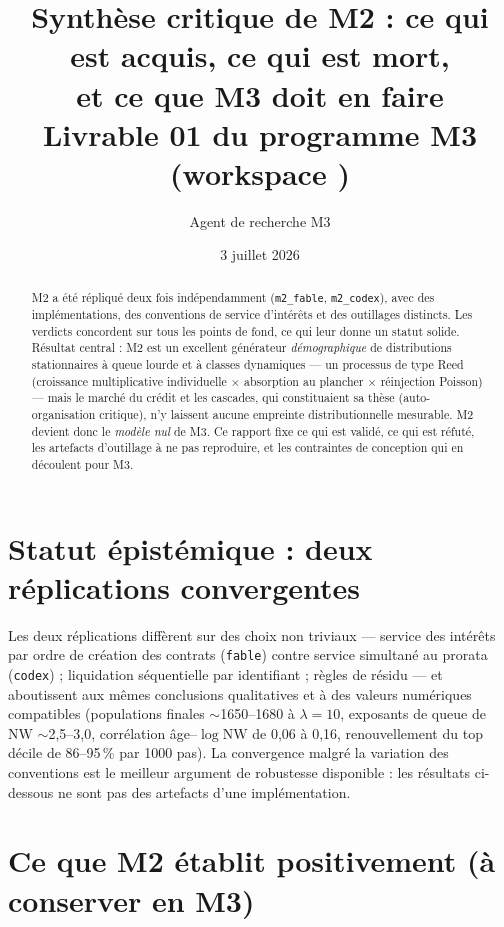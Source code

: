 \documentclass[11pt,a4paper]{article}
\title{Synthèse critique de M2 : ce qui est acquis, ce qui est mort,\\
et ce que M3 doit en faire\\
\large Livrable 01 du programme M3 (workspace \code{m3\_credit\_soc})}
\author{Agent de recherche M3}
\date{3 juillet 2026}
\newcommand{\NW}{\mathrm{NW}}
\newcommand{\code}[1]{\texttt{#1}}
\begin{document}
\maketitle

\begin{abstract}
M2 a été répliqué deux fois indépendamment (\code{m2\_fable}, \code{m2\_codex}),
avec des implémentations, des conventions de service d'intérêts et des outillages
distincts. Les verdicts concordent sur tous les points de fond, ce qui leur donne
un statut solide. Résultat central : M2 est un excellent générateur
\emph{démographique} de distributions stationnaires à queue lourde et à classes
dynamiques --- un processus de type Reed (croissance multiplicative individuelle
$\times$ absorption au plancher $\times$ réinjection Poisson) --- mais le marché
du crédit et les cascades, qui constituaient sa thèse (auto-organisation
critique), n'y laissent aucune empreinte distributionnelle mesurable. M2 devient
donc le \emph{modèle nul} de M3. Ce rapport fixe ce qui est validé, ce qui est
réfuté, les artefacts d'outillage à ne pas reproduire, et les contraintes de
conception qui en découlent pour M3.
\end{abstract}

\section{Statut épistémique : deux réplications convergentes}

Les deux réplications diffèrent sur des choix non triviaux --- service des
intérêts par ordre de création des contrats (\code{fable}) contre service
simultané au prorata (\code{codex}) ; liquidation séquentielle par identifiant ;
règles de résidu --- et aboutissent aux mêmes conclusions qualitatives et à des
valeurs numériques compatibles (populations finales $\sim$1650--1680 à
$\lambda=10$, exposants de queue de $\NW$ $\sim$2,5--3,0, corrélation
âge--$\log\NW$ de 0,06 à 0,16, renouvellement du top décile de 86--95\,\% par
1000 pas). La convergence malgré la variation des conventions est le meilleur
argument de robustesse disponible : les résultats ci-dessous ne sont pas des
artefacts d'une implémentation.

\section{Ce que M2 établit positivement (à conserver en M3)}
\end{document}
